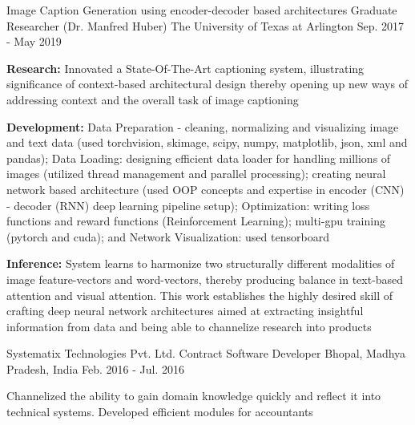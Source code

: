 \begin{cventries}
    	
	\cventry  
    	{Image Caption Generation using encoder-decoder based 		architectures}
    	{Graduate Researcher (Dr. Manfred Huber)} %
    	{The University of Texas at Arlington} %
    	{Sep. 2017 - May 2019} %
    	{  
      		\begin{cvitems} %
				\item {\textbf{Research:} Innovated a State-Of-The-Art captioning system, illustrating significance of context-based architectural design thereby opening up new ways of addressing context and the overall task of image captioning}
				\item {\textbf{Development:} Data Preparation -  cleaning, normalizing and visualizing image and text data (used  torchvision, skimage, scipy, numpy, matplotlib, json, xml and pandas); Data Loading: designing efficient data loader for handling millions of images (utilized thread management and parallel processing); creating neural network based architecture  (used OOP concepts and expertise in encoder (CNN) - decoder (RNN) deep learning pipeline setup); Optimization: writing loss functions and reward functions (Reinforcement Learning); multi-gpu training (pytorch and cuda); and Network Visualization: used tensorboard}		
				\item {\textbf{Inference:} System learns to harmonize two structurally different modalities of image feature-vectors and word-vectors, thereby producing balance in text-based attention and visual attention. This work establishes the highly desired skill of crafting deep neural network architectures aimed at extracting insightful information from data and being able to channelize research into products} 
 				\vspace*{0.05in}
      		\end{cvitems}
		} 
		
		
		
		
		
	\cventry
		{Systematix Technologies Pvt. Ltd.}  	
  		{Contract Software Developer}
		{Bhopal, Madhya Pradesh, India}
		{Feb. 2016 - Jul. 2016}	
		{
			\begin{cvitems} %
				\item {Channelized the ability to gain domain knowledge quickly and reflect it into technical systems. Developed efficient modules for accountants} \vspace*{0.05in}
			\end{cvitems}
		}





\end{cventries}

